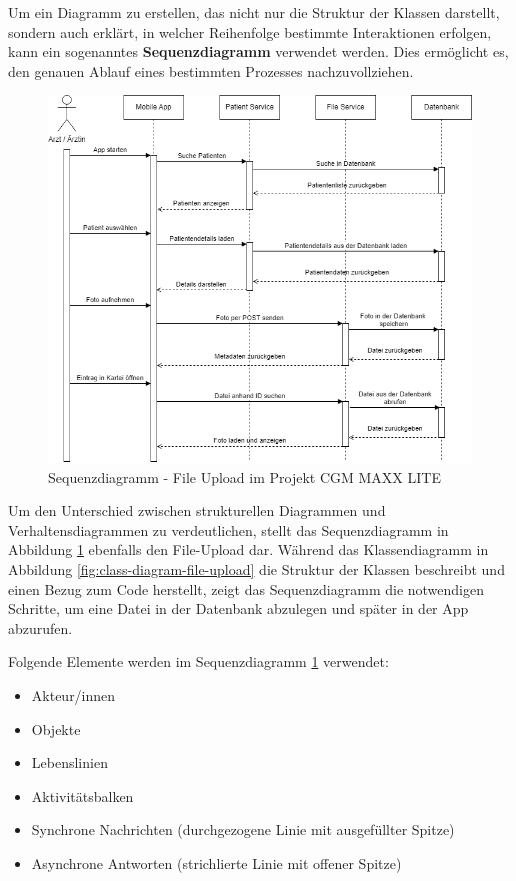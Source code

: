         Um ein Diagramm zu erstellen, das nicht nur die Struktur der Klassen darstellt, sondern auch erklärt, in welcher Reihenfolge bestimmte Interaktionen erfolgen, kann ein sogenanntes \textbf{Sequenzdiagramm} verwendet werden. Dies ermöglicht es, den genauen Ablauf eines bestimmten Prozesses nachzuvollziehen.
        \cite{EA:Web23, EA:Web24} \\

        \begin{figure}[H]
            \centering
            \includegraphics[width=1\linewidth]{images/EA/uml-sequence-diagram.png}
            \caption{Sequenzdiagramm - File Upload im Projekt CGM MAXX LITE}
            \label{fig:sequence-diagram-file-upload}
        \end{figure}

        \clearpage

        Um den Unterschied zwischen strukturellen Diagrammen und Verhaltensdiagrammen zu verdeutlichen, stellt das Sequenzdiagramm in Abbildung \ref{fig:sequence-diagram-file-upload} ebenfalls den File-Upload dar. Während das Klassendiagramm in Abbildung \ref{fig:class-diagram-file-upload} die Struktur der Klassen beschreibt und einen Bezug zum Code herstellt, zeigt das Sequenzdiagramm die notwendigen Schritte, um eine Datei in der Datenbank abzulegen und später in der App abzurufen.

        Folgende Elemente werden im Sequenzdiagramm \ref{fig:sequence-diagram-file-upload} verwendet:
        \begin{itemize}
            \item Akteur/innen
            \item Objekte
            \item Lebenslinien
            \item Aktivitätsbalken
            \item Synchrone Nachrichten (durchgezogene Linie mit ausgefüllter Spitze)
            \item Asynchrone Antworten (strichlierte Linie mit offener Spitze)
        \end{itemize}

